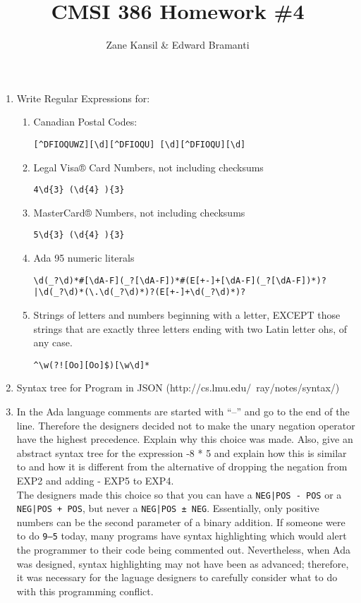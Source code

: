 \documentclass{article}
\begin{document}
\title{CMSI 386 Homework \#4}
\author{Zane Kansil \& Edward Bramanti}
\maketitle
\begin{enumerate}
\item Write Regular Expressions for:
\begin{enumerate}
\item Canadian Postal Codes:
\begin{verbatim}
[^DFIOQUWZ][\d][^DFIOQU] [\d][^DFIOQU][\d]
\end{verbatim}
\item Legal Visa® Card Numbers, not including checksums
\begin{verbatim}
4\d{3} (\d{4} ){3}
\end{verbatim}
\item MasterCard® Numbers, not including checksums
\begin{verbatim}
5\d{3} (\d{4} ){3}
\end{verbatim}
\item Ada 95 numeric literals
\begin{verbatim}
\d(_?\d)*#[\dA-F](_?[\dA-F])*#(E[+-]+[\dA-F](_?[\dA-F])*)?
|\d(_?\d)*(\.\d(_?\d)*)?(E[+-]+\d(_?\d)*)?
\end{verbatim}
\item Strings of letters and numbers beginning with a letter, EXCEPT those strings that are exactly three letters ending with two Latin letter ohs, of any case.
\begin{verbatim}
^\w(?![Oo][Oo]$)[\w\d]*
\end{verbatim}
\end{enumerate}
\pagebreak
\item Syntax tree for Program in JSON (http://cs.lmu.edu/~ray/notes/syntax/)

\pagebreak
\item In the Ada language comments are started with ``--'' and go to the end of the line. Therefore the designers decided not to make the unary negation operator have the highest precedence. Explain why this choice was made. Also, give an abstract syntax tree for the expression -8 * 5 and explain how this is similar to and how it is different from the alternative of dropping the negation from EXP2 and adding - EXP5 to EXP4. \\
The designers made this choice so that you can have a \texttt{NEG|POS - POS} or a \texttt{NEG|POS + POS}, but never a \texttt{NEG|POS ± NEG}. Essentially, only positive numbers can be the second parameter of a binary addition. If someone were to do \texttt{9--5} today, many programs have syntax highlighting which would alert the programmer to their code being commented out. Nevertheless, when Ada was designed, syntax highlighting may not have been as advanced; therefore, it was necessary for the laguage designers to carefully consider what to do with this programming conflict. \\

\end{enumerate}
\end{document}
